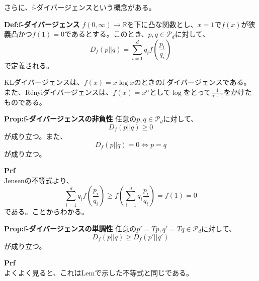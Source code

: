 \documentclass[a4paper,11pt]{jsarticle}
\numberwithin{equation}{section}
\begin{document}
さらに、f-ダイバージェンスという概念がある。\\
\begin{itembox}[l]{\textbf{Def:f-ダイバージェンス}}
    $f(0, \infty) \to \mathbb{R}$を下に凸な関数とし、$x=1$で$f(x)$が狭義凸かつ$f(1)=0$であるとする。このとき、$p, q \in \mathcal{P}_d$に対して、
    \begin{equation}
        D_f(p||q) = \sum_{i=1}^{d}q_i f\left(\frac{p_i}{q_i}\right)
    \end{equation}
    で定義される。
\end{itembox}

KLダイバージェンスは、$f(x) = x\log x$のときのf-ダイバージェンスである。また、Rényiダイバージェンスは、$f(x) = x^{\alpha}$として$\log$をとって$\frac{1}{\alpha - 1}$をかけたものである。\\

\begin{itembox}[l]{\textbf{Prop:f-ダイバージェンスの非負性}}
    任意の$p, q \in \mathcal{P}_d$に対して、
    \begin{equation}
        D_f(p||q) \geq 0
    \end{equation}
    が成り立つ。また、
    \begin{equation}
        D_f(p||q) = 0 \Leftrightarrow p = q
    \end{equation}
    が成り立つ。
\end{itembox}
\textbf{Prf}\\
Jensenの不等式より、
\begin{equation}
    \sum_{i=1}^{d}q_i f\left(\frac{p_i}{q_i}\right) \geq f\left(\sum_{i=1}^{d}q_i \frac{p_i}{q_i}\right) = f(1) = 0
\end{equation}
である。ことからわかる。\hfill \qedsymbol\\

\begin{itembox}[l]{\textbf{Prop:f-ダイバージェンスの単調性}}
    任意の$p' = Tp, q' = Tq \in \mathcal{P}_d$に対して、
    \begin{equation}
        D_f(p||q) \geq D_f(p'||q')
    \end{equation}
    が成り立つ。
\end{itembox}
\textbf{Prf}\\
よくよく見ると、これはLemで示した不等式と同じである。\hfill \qedsymbol\\
\end{document}
